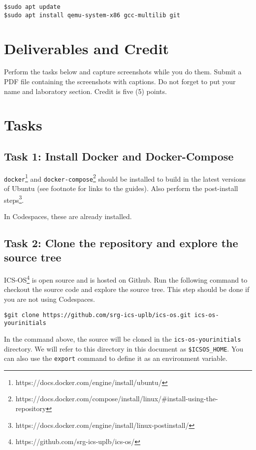 \documentclass[a4paper, 11pt,oneside]{article}
\begin{document}
\begin{verbatim}
$sudo apt update
$sudo apt install qemu-system-x86 gcc-multilib git
\end{verbatim}


\section{Deliverables and Credit}
Perform the tasks below and capture screenshots while you do them. Submit a PDF 
file containing the screenshots with captions. Do not forget to put your name 
and laboratory section. Credit is five (5) points.

\section{Tasks}

\subsection*{Task 1: Install Docker and Docker-Compose}
\texttt{docker}\footnote{https://docs.docker.com/engine/install/ubuntu/} and 
\texttt{docker-compose}\footnote{https://docs.docker.com/compose/install/linux/\#install-using-the-repository} 
should be installed to build in the latest versions of Ubuntu (see footnote for 
links to the guides). Also perform the post-install steps\footnote{https://docs.docker.com/engine/install/linux-postinstall/}. 

In Codespaces, these are already installed.

\subsection*{Task 2: Clone the repository and explore the source tree}
ICS-OS\footnote{https://github.com/srg-ics-uplb/ics-os/} is open source and is 
hosted on Github. Run the following command to checkout the source code and 
explore the source tree. This step should be done if you are not using Codespaces.


\begin{verbatim}
$git clone https://github.com/srg-ics-uplb/ics-os.git ics-os-yourinitials
\end{verbatim}

In the command above, the source will be cloned in the \texttt{ics-os-yourinitials} directory. We will refer to this directory in this document as \texttt{\$ICSOS\_HOME}. You can also use the \texttt{export} command to define it as an environment variable.
\end{document}
